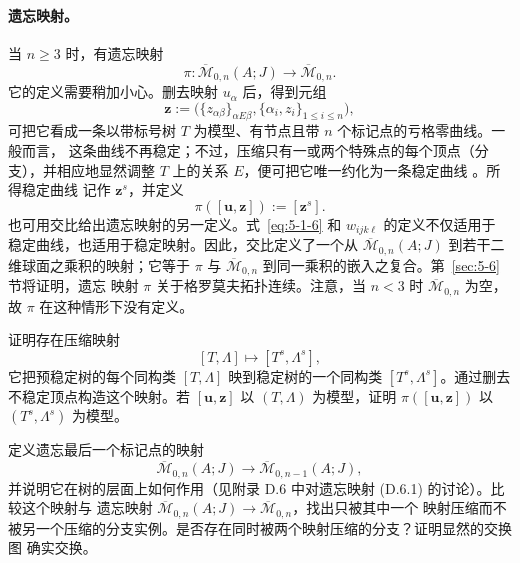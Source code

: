 \paragraph{遗忘映射。}
当 $n\ge3$ 时，有遗忘映射
\[
  \pi:\overline{\mathcal M}_{0,n}(A;J)\longrightarrow\overline{\mathcal M}_{0,n}.
\]
它的定义需要稍加小心。删去映射 $u_\alpha$ 后，得到元组
\[
  \mathbf z:=\bigl(\{z_{\alpha\beta}\}_{\alpha E\beta},
  \{\alpha_i,z_i\}_{1\le i\le n}\bigr),
\]
可把它看成一条以带标号树 $T$ 为模型、有节点且带 $n$ 个标记点的亏格零曲线。一般而言，
这条曲线不再稳定；不过，压缩只有一或两个特殊点的每个顶点（分支），并相应地显然调整
$T$ 上的关系 $E$，便可把它唯一约化为一条稳定曲线
。所得稳定曲线
记作 $\mathbf z^s$，并定义
\[
  \pi([\mathbf u,\mathbf z]):=[\mathbf z^s].
\]
也可用交比给出遗忘映射的另一定义。式~\eqref{eq:5-1-6} 和 $w_{ijk\ell}$ 的定义不仅适用于
稳定曲线，也适用于稳定映射。因此，交比定义了一个从
$\overline{\mathcal M}_{0,n}(A;J)$ 到若干二维球面之乘积的映射；它等于 $\pi$ 与
$\overline{\mathcal M}_{0,n}$ 到同一乘积的嵌入之复合。第~\ref{sec:5-6} 节将证明，遗忘
映射 $\pi$ 关于格罗莫夫拓扑连续。注意，当 $n<3$ 时 $\overline{\mathcal M}_{0,n}$ 为空，
故 $\pi$ 在这种情形下没有定义。

\begin{exercise}\label{ex:5-1-8}
证明存在压缩映射
\[
  [T,\Lambda]\longmapsto[T^s,\Lambda^s],
\]
它把预稳定树的每个同构类 $[T,\Lambda]$ 映到稳定树的一个同构类
$[T^s,\Lambda^s]$。通过删去不稳定顶点构造这个映射。若
$[\mathbf u,\mathbf z]$ 以 $(T,\Lambda)$ 为模型，证明
$\pi([\mathbf u,\mathbf z])$ 以 $(T^s,\Lambda^s)$ 为模型。
\end{exercise}

\begin{exercise}\label{ex:5-1-9}
定义遗忘最后一个标记点的映射
\[
  \overline{\mathcal M}_{0,n}(A;J)
  \longrightarrow\overline{\mathcal M}_{0,n-1}(A;J),
\]
并说明它在树的层面上如何作用（见附录 D.6 中对遗忘映射 (D.6.1) 的讨论）。比较这个映射与
遗忘映射 $\overline{\mathcal M}_{0,n}(A;J)\to\overline{\mathcal M}_{0,n}$，找出只被其中一个
映射压缩而不被另一个压缩的分支实例。是否存在同时被两个映射压缩的分支？证明显然的交换图
确实交换。
\end{exercise}

